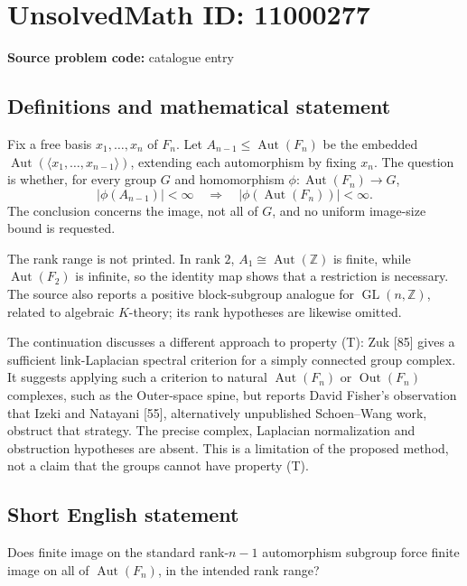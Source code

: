 \documentclass[11pt]{article}
\newcommand{\Z}{\mathbb{Z}}
\begin{document}
\section*{UnsolvedMath ID: 11000277}
\textbf{Source problem code:} catalogue entry
\subsection{Definitions and mathematical statement}
Fix a free basis \(x_1,\ldots,x_n\) of \(F_n\). Let \(A_{n-1}\leq\operatorname{Aut}(F_n)\) be the embedded \(\operatorname{Aut}(\langle x_1,\ldots,x_{n-1}\rangle)\), extending each automorphism by fixing \(x_n\). The question is whether, for every group \(G\) and homomorphism \(\phi:\operatorname{Aut}(F_n)\to G\),
\[
 |\phi(A_{n-1})|<\infty\quad\Longrightarrow\quad
 |\phi(\operatorname{Aut}(F_n))|<\infty.
\]
The conclusion concerns the image, not all of \(G\), and no uniform image-size bound is requested.

The rank range is not printed. In rank \(2\), \(A_1\cong\operatorname{Aut}(\Z)\) is finite, while \(\operatorname{Aut}(F_2)\) is infinite, so the identity map shows that a restriction is necessary. The source also reports a positive block-subgroup analogue for \(\operatorname{GL}(n,\Z)\), related to algebraic \(K\)-theory; its rank hypotheses are likewise omitted.

The continuation discusses a different approach to property (T): Zuk [85] gives a sufficient link-Laplacian spectral criterion for a simply connected group complex. It suggests applying such a criterion to natural \(\operatorname{Aut}(F_n)\) or \(\operatorname{Out}(F_n)\) complexes, such as the Outer-space spine, but reports David Fisher's observation that Izeki and Natayani [55], alternatively unpublished Schoen--Wang work, obstruct that strategy. The precise complex, Laplacian normalization and obstruction hypotheses are absent. This is a limitation of the proposed method, not a claim that the groups cannot have property (T).
\subsection{Short English statement}
Does finite image on the standard rank-\(n-1\) automorphism subgroup force finite image on all of \(\operatorname{Aut}(F_n)\), in the intended rank range?
\end{document}
